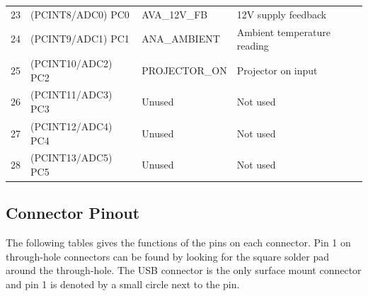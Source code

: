 \documentclass{article}
\newcommand{\abrackets}[1]{\textlangle #1\textrangle}
\begin{document}
\begin{center}
\begin{tabular}{c|l|l|l}
        23 & (PCINT8/ADC0) PC0 & AVA\_12V\_FB & 12V supply feedback \\
        24 & (PCINT9/ADC1) PC1 & ANA\_AMBIENT & Ambient temperature reading \\
        25 & (PCINT10/ADC2) PC2 & PROJECTOR\_ON & Projector on input \\
        26 & (PCINT11/ADC3) PC3 & \abrackets{Unused} & Not used \\
        27 & (PCINT12/ADC4) PC4 & \abrackets{Unused} & Not used \\
        28 & (PCINT13/ADC5) PC5 & \abrackets{Unused} & Not used \\
    \end{tabular}
\end{center}

\subsection{Connector Pinout} \label{ssec:ConnPinout}
The following tables gives the functions of the pins on each connector.  Pin 1 on through-hole
connectors can be found by looking for the square solder pad around the through-hole.  The USB
connector is the only surface mount connector and pin 1 is denoted by a small circle next to the
pin.
\end{document}
